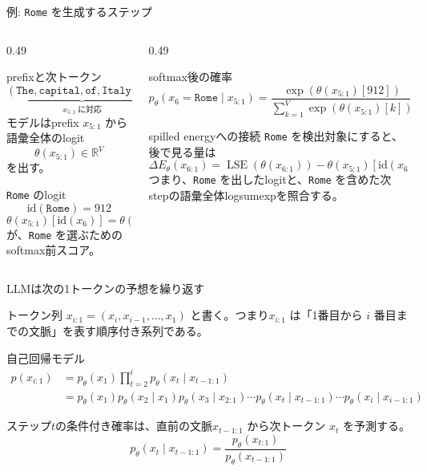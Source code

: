 \documentclass[dvipdfmx,uplatex,unicode,9pt,aspectratio=169]{beamer}
\newcommand{\tok}[1]{\texttt{#1}}
\newcommand{\DeltaE}{\Delta E_{\theta}}
\newcommand{\LSE}{\operatorname{LSE}}
\begin{document}
\begin{frame}{例: \tok{Rome} を生成するステップ}
\small
\begin{columns}[T,onlytextwidth]
\begin{column}{0.49\linewidth}
\begin{block}{prefixと次トークン}
\[
\underbrace{(\tok{The},\tok{capital},\tok{of},\tok{Italy},\tok{is})}_{x_{5:1}\;\text{に対応}}
\rightarrow
\underbrace{\tok{Rome}}_{x_6}
\]
モデルはprefix $x_{5:1}$ から語彙全体のlogit
\[
\theta(x_{5:1})\in\mathbb{R}^{V}
\]
を出す。
\end{block}
\begin{block}{\tok{Rome} のlogit}
\[
\mathrm{id}(\tok{Rome})=912
\]
\[
\theta(x_{5:1})[\mathrm{id}(x_6)]
=\theta(x_{5:1})[912]
\]
が、\tok{Rome} を選ぶためのsoftmax前スコア。
\end{block}
\end{column}
\begin{column}{0.49\linewidth}
\begin{block}{softmax後の確率}
\[
p_\theta(x_6=\tok{Rome}\mid x_{5:1})
=\frac{\exp(\theta(x_{5:1})[912])}
{\sum_{k=1}^{V}\exp(\theta(x_{5:1})[k])}.
\]
\end{block}
\begin{block}{spilled energyへの接続}
\tok{Rome} を検出対象にすると、後で見る量は
\[
\DeltaE(x_{6:1})
=\LSE(\theta(x_{6:1}))-\theta(x_{5:1})[\mathrm{id}(x_6)].
\]
つまり、\tok{Rome} を出したlogitと、\tok{Rome} を含めた次stepの語彙全体logsumexpを照合する。
\end{block}
\end{column}
\end{columns}
\end{frame}



\begin{frame}{LLMは次の1トークンの予想を繰り返す}
\begin{block}{トークン列}
$x_{i:1}=(x_i,x_{i-1},\ldots,x_1)$ と書く。つまり$x_{i:1}$ は「1番目から $i$ 番目までの文脈」を表す順序付き系列である。
\end{block}
\begin{block}{自己回帰モデル}
\begin{align}
  p(x_{i:1}) &= p_\theta(x_1)\prod_{t=2}^{i}p_\theta(x_t\mid x_{t-1:1}) \label{eq:autoregressive} \\
 &= p_\theta(x_1)p_\theta(x_2\mid x_1)p_\theta(x_3\mid x_{2:1})\cdots p_\theta(x_t\mid x_{t-1:1}) \cdots p_\theta(x_i\mid x_{i-1:1})
\end{align}
\end{block}
ステップ$t$の条件付き確率は、直前の文脈$x_{t-1:1}$ から次トークン $x_t$ を予測する。
\begin{equation}
  p_\theta(x_t\mid x_{t-1:1}) = \frac{p_\theta(x_{t:1})}{p_\theta(x_{t-1:1})} \label{eq:conditional_probability}
\end{equation}
\end{frame}
\end{document}
